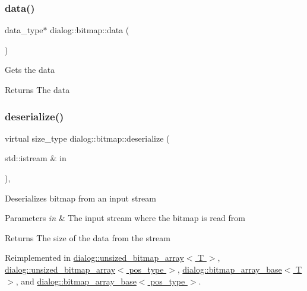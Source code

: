 \subsubsection{\texorpdfstring{data()}{data()}}
{\footnotesize\ttfamily data\+\_\+type$\ast$ dialog\+::bitmap\+::data (\begin{DoxyParamCaption}{ }\end{DoxyParamCaption})\hspace{0.3cm}{\ttfamily [inline]}}

Gets the data \begin{DoxyReturn}{Returns}
The data 
\end{DoxyReturn}
\mbox{\label{classdialog_1_1bitmap_a5c4c9a790b785bbc021d913a53cffe80}} 
\subsubsection{\texorpdfstring{deserialize()}{deserialize()}}
{\footnotesize\ttfamily virtual size\+\_\+type dialog\+::bitmap\+::deserialize (\begin{DoxyParamCaption}\item[{std\+::istream \&}]{in }\end{DoxyParamCaption})\hspace{0.3cm}{\ttfamily [inline]}, {\ttfamily [virtual]}}

Deserializes bitmap from an input stream 
\begin{DoxyParams}{Parameters}
{\em in} & The input stream where the bitmap is read from \\
\hline
\end{DoxyParams}
\begin{DoxyReturn}{Returns}
The size of the data from the stream 
\end{DoxyReturn}


Reimplemented in \hyperlink{classdialog_1_1unsized__bitmap__array_a4ae9d743033be4468f4c0be8dbaccbca}{dialog\+::unsized\+\_\+bitmap\+\_\+array$<$ T $>$}, \hyperlink{classdialog_1_1unsized__bitmap__array_a4ae9d743033be4468f4c0be8dbaccbca}{dialog\+::unsized\+\_\+bitmap\+\_\+array$<$ pos\+\_\+type $>$}, \hyperlink{classdialog_1_1bitmap__array__base_a51a91fced01d96475dc24e23da2d06e8}{dialog\+::bitmap\+\_\+array\+\_\+base$<$ T $>$}, and \hyperlink{classdialog_1_1bitmap__array__base_a51a91fced01d96475dc24e23da2d06e8}{dialog\+::bitmap\+\_\+array\+\_\+base$<$ pos\+\_\+type $>$}.

